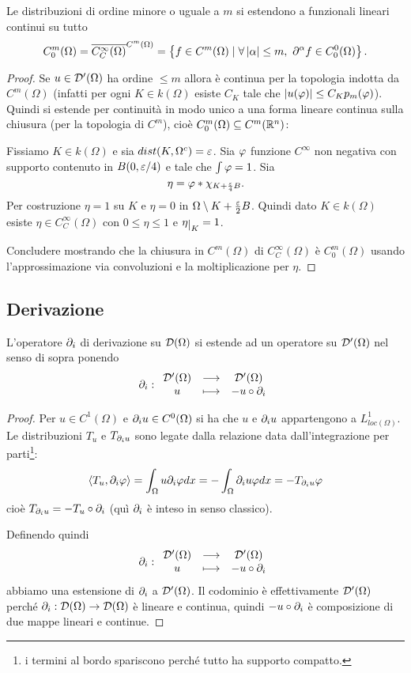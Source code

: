 \begin{proposition}\label{PrDistribuzioniDiOrdineFinitoSiEstendonoAFunzionaliContinuiSuRegolariNulleAlBordo}
Le distribuzioni di ordine minore o uguale a $m$ si estendono a funzionali lineari continui su tutto 
\[C^m_0(\Omega)=\overline{C^\infty_C(\Omega)}^{C^m(\Omega)}=\left\{{f\in C^m(\Omega)\mid \forall \left|{\alpha}\right|\leq m,\ \partial^\alpha f\in C^0_0(\Omega)}\right\}.\]
\end{proposition}
\begin{proof}
Se $u\in \mathcal{D}'(\Omega)$ ha ordine $\leq m$ allora \`e continua per la topologia indotta da $C^m(\Omega)$ (infatti per ogni $K\in k(\Omega)$ esiste $C_K$ tale che $\left|{u(\varphi)}\right|\leq C_Kp_m(\varphi)$). Quindi si estende per continuit\`a in modo unico a una forma lineare continua sulla chiusura (per la topologia di $C^m$), cio\`e $C^m_0(\Omega)\subseteq C^m(\mathbb{R}^n)$:

Fissiamo $K\in k(\Omega)$ e sia $dist(K,\Omega^c)=\varepsilon$. Sia $\varphi$ funzione $C^\infty$ non negativa con supporto contenuto in $B(0,\varepsilon/4)$ e tale che $\int \varphi=1$. Sia 
\[\eta=\varphi\ast\chi_{K+\frac{\varepsilon}4B}.\]
Per costruzione $\eta=1$ su $K$ e $\eta=0$ in $\Omega\setminus K+\frac{\varepsilon}2 B$.
Quindi dato $K\in k(\Omega)$ esiste $\eta\in C^\infty_C(\Omega)$ con $0\leq \eta\leq 1$ e $\eta\res K=1$.


Concludere mostrando che la chiusura in $C^m(\Omega)$ di $C_C^\infty(\Omega)$ \`e $C^m_0(\Omega)$ usando l'approssimazione via convoluzioni e la moltiplicazione per $\eta$.
\end{proof}

\subsection{Derivazione}
\begin{proposition}
L'operatore $\partial_i$ di derivazione su $\mathcal{D}(\Omega)$ si estende ad un operatore su $\mathcal{D}'(\Omega)$ nel senso di sopra ponendo
\[\partial_i:\begin{array}{ccc} {\mathcal{D}'(\Omega)} & \longrightarrow & {\mathcal{D}'(\Omega)}\\ {u} & \longmapsto & {-u\circ \partial_i} \end{array}\]
\end{proposition}
\begin{proof}
Per $u\in C^1(\Omega)$ e $\partial_i u\in C^0(\Omega)$ si ha che $u$ e $\partial_i u$ appartengono a $L^1_{loc(\Omega)}$. Le distribuzioni $T_u$ e $T_{\partial_i u}$ sono legate dalla relazione data dall'integrazione per parti\footnote{i termini al bordo spariscono perch\'e tutto ha supporto compatto.}:
\[\left\langle {T_u,\partial_i\varphi}\right\rangle=\int_\Omega u\partial_i\varphi dx=-\int_\Omega\partial_i u\varphi dx=-T_{\partial_i u} \varphi\]
cio\`e $T_{\partial_iu}=-T_u\circ \partial_i$ (qu\`i $\partial_i$ \`e inteso in senso classico).
\smallskip

\noindent
Definendo quindi
\[\partial_i:\begin{array}{ccc} {\mathcal{D}'(\Omega)} & \longrightarrow & {\mathcal{D}'(\Omega)}\\ {u} & \longmapsto & {-u\circ \partial_i} \end{array}\]
abbiamo una estensione di $\partial_i$ a $\mathcal{D}'(\Omega)$. Il codominio \`e effettivamente $\mathcal{D}'(\Omega)$ perch\'e $\partial_i:\mathcal{D}(\Omega)\to\mathcal{D}(\Omega)$ \`e lineare e continua, quindi $-u\circ \partial_i$ \`e composizione di due mappe lineari e continue.
\end{proof}



